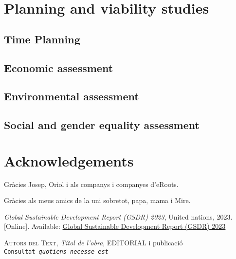\documentclass[a4paper,11pt, titlepage, twoside]{article}
\begin{document}
\section{Planning and viability studies}

\subsection{Time Planning}
\subsection{Economic assessment}
\subsection{Environmental assessment}
\subsection{Social and gender equality assessment}



\section*{Acknowledgements}
 Gràcies Josep, Oriol i als companys i companyes d'eRoots.\par
 Gràcies als meus amics de la uni sobretot, papa, mama i Mire.

 
 
 \begin{thebibliography}{99}\label{biblio}
 

 \textit{Global Sustainable Development Report (GSDR) 2023}, United nations, 2023. [Online]. 
 Available: \href{https://sdgs.un.org/gsdr/gsdr2023}{Global Sustainable Development Report (GSDR) 2023}
 
  \textsc{Autors del Text}, {} 
 \textit{Títol de l'obra}, EDITORIAL i publicació\\ 
 \texttt{Consultat \emph{quotiens necesse est}}
 
 

 \end{thebibliography}
 
 
\end{document}

